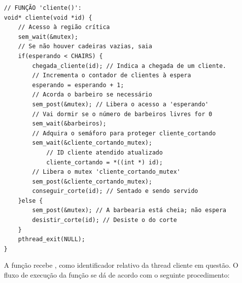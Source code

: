 \documentclass[
	12pt,				%
	openright,			%
	oneside,			%
	a4paper,			%
	chapter=TITLE,		%
	english,			%
	french,				%
	spanish,			%
	brazil				%
	]{abntex2}
\theoremstyle{definition}
\begin{document}
\begin{verbatim}
// FUNÇÃO 'cliente()':
void* cliente(void *id) {
    // Acesso à região crítica
    sem_wait(&mutex); 
    // Se não houver cadeiras vazias, saia 
    if(esperando < CHAIRS) { 
        chegada_cliente(id); // Indica a chegada de um cliente.
        // Incrementa o contador de clientes à espera
        esperando = esperando + 1;
        // Acorda o barbeiro se necessário 
        sem_post(&mutex); // Libera o acesso a 'esperando' 
        // Vai dormir se o número de barbeiros livres for 0 
        sem_wait(&barbeiros);
        // Adquira o semáforo para proteger cliente_cortando
        sem_wait(&cliente_cortando_mutex); 
            // ID cliente atendido atualizado
            cliente_cortando = *((int *) id);
        // Libera o mutex 'cliente_cortando_mutex'
        sem_post(&cliente_cortando_mutex);
        conseguir_corte(id); // Sentado e sendo servido 
    }else {
        sem_post(&mutex); // A barbearia está cheia; não espera 
        desistir_corte(id); // Desiste o do corte
    }
    pthread_exit(NULL);
}
\end{verbatim}

A função  recebe , como identificador relativo da thread cliente  em questão. O fluxo de execução da função se dá de acordo com o seguinte procedimento:
\end{document}
